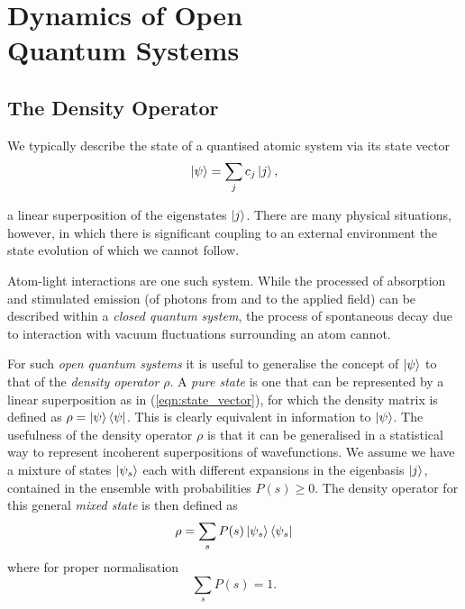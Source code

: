\chapter[Dynamics of Open Quantum Systems]
  {Dynamics of Open\\ Quantum Systems}
  \label{apx:qu_dyn}

  \section{The Density Operator}

    We typically describe the state of a quantised atomic system via its state
    vector
    \begin{equation}
      \Ket{\psi} = \sum_j{c_j} \Ket{j},
      \label{eqn:state_vector}
    \end{equation}

    a linear superposition of the eigenstates $\Ket{j}$. There are many physical
    situations, however, in which there is significant coupling to an external
    environment the state evolution of which we cannot follow.

    Atom-light interactions are one such system. While the processed of
    absorption and stimulated emission (of photons from and to the applied
    field) can be described within a \textit{closed quantum system}, the process
    of spontaneous decay due to interaction with vacuum fluctuations surrounding
    an atom cannot.

    For such \textit{open quantum systems} it is useful to generalise the
    concept of $\Ket{\psi}$ to that of the \textit{density operator} $\rho$. A
    \textit{pure state} is one that can be represented by a linear superposition
    as in (\ref{eqn:state_vector}), for which the density matrix is defined as
    $\rho = \Ket{\psi} \Bra{\psi}$. This is clearly equivalent in information to
    $\Ket{\psi}$. The usefulness of the density operator $\rho$ is that it can
    be generalised in a statistical way to represent incoherent superpositions
    of wavefunctions. We assume we have a mixture of states $\Ket{\psi_s}$ each
    with different expansions in the eigenbasis $\Ket{j}$, contained in the
    ensemble with probabilities $P(s) \ge 0$. The density operator for this
    general \textit{mixed state} is then defined as
    \begin{equation}
      \rho = \sum_s P(s) \Ket{\psi_s} \Bra{\psi_s}
    \end{equation}
    where for proper normalisation
    \begin{equation}
      \sum_s P(s) = 1.
    \end{equation}

